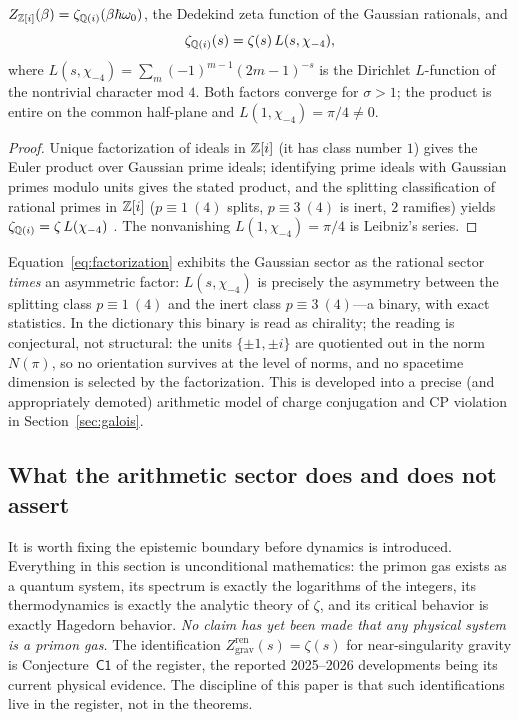 \begin{theorem}\label{thm:dedekind}
$Z_{\mathbb{Z}[i]}(\beta)=\zeta_{\mathbb{Q}(i)}(\beta\hbar\omega_{0})$, the Dedekind zeta function of the
Gaussian rationals, and
\begin{equation}\label{eq:factorization}
\zeta_{\mathbb{Q}(i)}(s)=\zeta(s)\,L(s,\chi_{-4}),
\end{equation}
where $L(s,\chi_{-4})=\sum_{m}(-1)^{m-1}(2m-1)^{-s}$ is the Dirichlet $L$-function of the
nontrivial character mod $4$. Both factors converge for $\sigma>1$; the product is
entire on the common half-plane and $L(1,\chi_{-4})=\pi/4\neq 0$.
\end{theorem}

\begin{proof}
Unique factorization of ideals in $\mathbb{Z}[i]$ (it has class number $1$) gives the Euler product
over Gaussian prime ideals; identifying prime ideals with Gaussian primes modulo units gives
the stated product, and the splitting classification of rational primes in $\mathbb{Z}[i]$
($p\equiv1\ (4)$ splits, $p\equiv3\ (4)$ is inert, $2$ ramifies) yields
$\zeta_{\mathbb{Q}(i)}=\zeta\,L(\chi_{-4})$ \cite{neukirch1999}. The nonvanishing
$L(1,\chi_{-4})=\pi/4$ is Leibniz's series.
\end{proof}

Equation~\eqref{eq:factorization} exhibits the Gaussian sector as the rational sector
\emph{times} an asymmetric factor: $L(s,\chi_{-4})$ is precisely the asymmetry between the
splitting class $p\equiv1\ (4)$ and the inert class $p\equiv3\ (4)$---a binary, with exact
statistics. In the dictionary this binary is read as chirality; the reading is conjectural,
not structural: the units $\{\pm1,\pm i\}$ are quotiented out in the norm $N(\pi)$, so no
orientation survives at the level of norms, and no spacetime dimension is selected by the
factorization. This is developed into a precise
(and appropriately demoted) arithmetic model of charge conjugation and CP violation in
Section~\ref{sec:galois}.

\subsection{What the arithmetic sector does and does not assert}

It is worth fixing the epistemic boundary before dynamics is introduced. Everything in this
section is unconditional mathematics: the primon gas exists as a quantum system, its spectrum
is exactly the logarithms of the integers, its thermodynamics is exactly the analytic theory
of $\zeta$, and its critical behavior is exactly Hagedorn behavior. \emph{No claim has yet
been made that any physical system is a primon gas.} The identification
$Z^{\mathrm{ren}}_{\mathrm{grav}}(s)=\zeta(s)$ for near-singularity gravity is
Conjecture~$\mathsf{C1}$ of the register, the reported 2025--2026 developments
\cite{hartnollyang2026} being its current physical evidence. The discipline of this paper is
that such identifications live in the register, not in the theorems.

